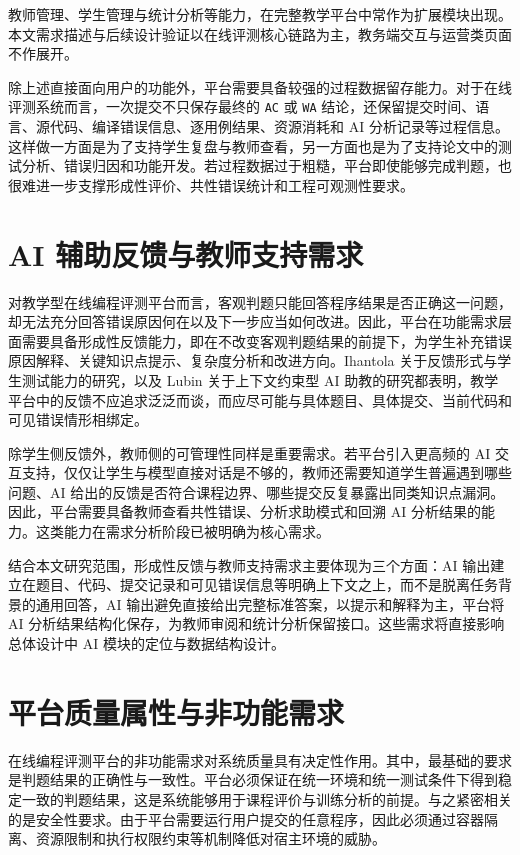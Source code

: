 教师管理、学生管理与统计分析等能力，在完整教学平台中常作为扩展模块出现。本文需求描述与后续设计验证以在线评测核心链路为主，教务端交互与运营类页面不作展开。

除上述直接面向用户的功能外，平台需要具备较强的过程数据留存能力。对于在线评测系统而言，一次提交不只保存最终的 \texttt{AC} 或 \texttt{WA} 结论，还保留提交时间、语言、源代码、编译错误信息、逐用例结果、资源消耗和 AI 分析记录等过程信息。这样做一方面是为了支持学生复盘与教师查看，另一方面也是为了支持论文中的测试分析、错误归因和功能开发。若过程数据过于粗糙，平台即使能够完成判题，也很难进一步支撑形成性评价、共性错误统计和工程可观测性要求。

\section{AI 辅助反馈与教师支持需求}

对教学型在线编程评测平台而言，客观判题只能回答程序结果是否正确这一问题，却无法充分回答错误原因何在以及下一步应当如何改进。因此，平台在功能需求层面需要具备形成性反馈能力，即在不改变客观判题结果的前提下，为学生补充错误原因解释、关键知识点提示、复杂度分析和改进方向。Ihantola 关于反馈形式与学生测试能力的研究，以及 Lubin 关于上下文约束型 AI 助教的研究都表明，教学平台中的反馈不应追求泛泛而谈，而应尽可能与具体题目、具体提交、当前代码和可见错误情形相绑定\cite{ihantola2011automated,lubin2025llm}。

除学生侧反馈外，教师侧的可管理性同样是重要需求。若平台引入更高频的 AI 交互支持，仅仅让学生与模型直接对话是不够的，教师还需要知道学生普遍遇到哪些问题、AI 给出的反馈是否符合课程边界、哪些提交反复暴露出同类知识点漏洞。因此，平台需要具备教师查看共性错误、分析求助模式和回溯 AI 分析结果的能力。这类能力在需求分析阶段已被明确为核心需求\cite{lubin2025llm}。

结合本文研究范围，形成性反馈与教师支持需求主要体现为三个方面：AI 输出建立在题目、代码、提交记录和可见错误信息等明确上下文之上，而不是脱离任务背景的通用回答，AI 输出避免直接给出完整标准答案，以提示和解释为主，平台将 AI 分析结果结构化保存，为教师审阅和统计分析保留接口。这些需求将直接影响总体设计中 AI 模块的定位与数据结构设计。

\section{平台质量属性与非功能需求}

在线编程评测平台的非功能需求对系统质量具有决定性作用。其中，最基础的要求是判题结果的正确性与一致性。平台必须保证在统一环境和统一测试条件下得到稳定一致的判题结果，这是系统能够用于课程评价与训练分析的前提。与之紧密相关的是安全性要求。由于平台需要运行用户提交的任意程序，因此必须通过容器隔离、资源限制和执行权限约束等机制降低对宿主环境的威胁。

